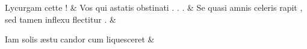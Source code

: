 \documentclass[12pt,onecolumn,twoside,a4paper]{memoir}
\begin{document}
\begin{pairs}
\begin{Leftside}
                              Lycurgam
                              cette
                              ! \&
                         \stanza 
                     Vos
                              qui
                              astatis
                              obstinati
                              .
                              .
                              . \&
                         \stanza 
                     Se
                              quasi
                              amnis
                              celeris
                              rapit
                              ,
                              sed
                              tamen
                              inflexu
                              flectitur
                              . \&
                         \stanza 
                     
                              Iam
                              solis
                              æstu
                              candor
                              cum
                              liquesceret \&
                     
                  \endnumbering
		\end{Leftside}
                  \begin{Rightside}
			\beginnumbering
			\numberstanzafalse
                     

\end{Rightside}
\end{pairs}
\end{document}
